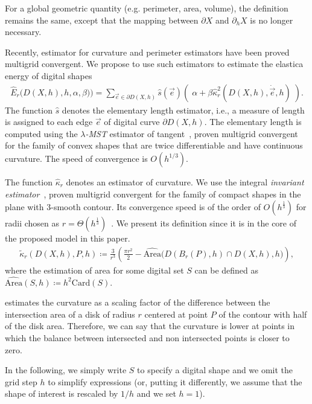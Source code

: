 \documentclass[review]{siamart220329}
\begin{document}
For a global geometric quantity (e.g. perimeter, area, volume), the definition remains the same, except that the mapping
between $\partial X$ and $\partial_h X$ is no longer necessary.

Recently, estimator for curvature and perimeter estimators have been proved multigrid convergent. We propose to use such estimators to estimate the elastica energy of digital shapes
%
%
\begin{align}
	\hat{E}_r\big( D(X,h),h,\alpha,\beta) \big) = \sum_{\vec{e} \in \partial D(X,h)}{ \hat{s}(\vec{e})\left(\; \alpha + \beta \hat{\kappa}_{r}^2(D(X,h),\dot{\vec{e}},h) \; \right)}.
	\label{eq:digital-energy}
\end{align}
%
%
The function $\hat{s}$ denotes the elementary length estimator, i.e., a measure of length is assigned to each edge $\vec{e}$ of digital curve $\partial D(X,h)$. The elementary length is computed using the \emph{$\lambda$-MST} estimator of tangent~\cite{lachaud07tangent,lachaud06hdr}, proven multigrid convergent for the family of convex shapes that are twice differentiable and have continuous curvature. The speed of convergence is $O(h^{1/3})$.

The function $\hat{\kappa} _r$ denotes an estimator of curvature. We use the integral \emph{invariant estimator}~\cite{coeurjolly13integral}, proven multigrid convergent for the family of compact shapes in the plane with $3$-smooth contour. Its convergence speed is of the order of $O(h^{\frac{1}{3}})$ for radii chosen as $r=\Theta (h^{\frac{1}{3}})$~\cite{lachaud2017robust}. We present its definition since it is in the core of the proposed model in this paper.
%
%
\begin{align}
  \tilde{\kappa}_r(D(X,h),P,h) \coloneqq \frac{3}{r^3}\left( \frac{\pi r^2}{2} - \widehat{\text{Area}}\big( D(B_r(P),h) \cap D(X,h),h\big) \right),
  \label{eq:curvature_approximation}
\end{align}
%
%
where the estimation of area for some digital set $S$ can be defined as $\widehat{\text{Area}}(S,h) \coloneqq h^2\text{Card}\left( S \right).$ 

 estimates the curvature as a scaling factor of the difference between the intersection area of a disk of radius $r$ centered at point $P$ of the contour with half of the disk area. Therefore, we can say that the curvature is lower at points in which the balance between intersected and non intersected points is closer to zero.

In the following, we simply write $S$ to specify a digital shape and we omit the grid step $h$ to simplify expressions (or, putting it differently, we assume that the shape of interest is rescaled by $1/h$ and we set $h = 1$).
%
%
%
%
%
\end{document}
